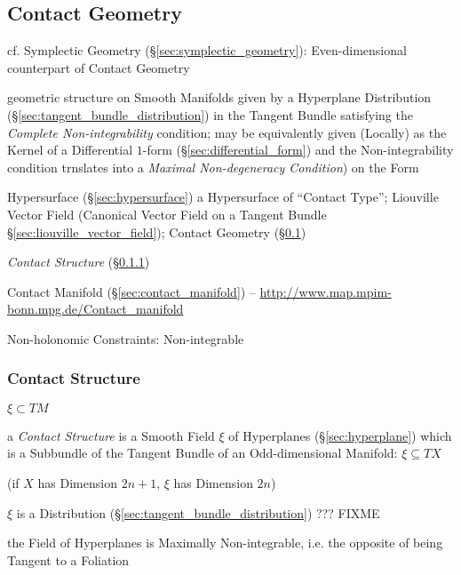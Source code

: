 \subsection{Contact Geometry}\label{sec:contact_geometry}

\fist cf. Symplectic Geometry (\S\ref{sec:symplectic_geometry}):
Even-dimensional counterpart of Contact Geometry

geometric structure on Smooth Manifolds given by a Hyperplane Distribution
(\S\ref{sec:tangent_bundle_distribution}) in the Tangent Bundle satisfying the
\emph{Complete Non-integrability} condition; may be equivalently given
(Locally) as the Kernel of a Differential $1$-form
(\S\ref{sec:differential_form}) and the Non-integrability condition trnslates
into a \emph{Maximal Non-degeneracy Condition}) on the Form

Hypersurface (\S\ref{sec:hypersurface}) a Hypersurface of ``Contact Type'';
Liouville Vector Field (Canonical Vector Field on a Tangent Bundle
\S\ref{sec:liouville_vector_field}); \fist Contact Geometry
(\S\ref{sec:contact_geometry})

\emph{Contact Structure} (\S\ref{sec:contact_structure})

\fist Contact Manifold (\S\ref{sec:contact_manifold}) --
\url{http://www.map.mpim-bonn.mpg.de/Contact_manifold}

Non-holonomic Constraints: Non-integrable



\subsubsection{Contact Structure}\label{sec:contact_structure}

$\xi \subset TM$

a \emph{Contact Structure} is a Smooth Field $\xi$ of Hyperplanes
(\S\ref{sec:hyperplane}) which is a Subbundle of the Tangent Bundle of an
Odd-dimensional Manifold: $\xi \subseteq T X$

(if $X$ has Dimension $2n+1$, $\xi$ has Dimension $2n$) %

$\xi$ is a Distribution (\S\ref{sec:tangent_bundle_distribution}) ??? FIXME

the Field of Hyperplanes is Maximally Non-integrable, i.e. the opposite of
being Tangent to a Foliation

